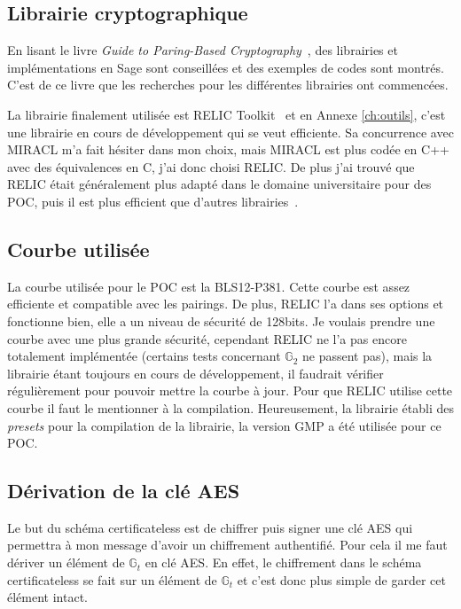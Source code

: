 \subsection{Librairie cryptographique}
En lisant le livre \textit{Guide to Paring-Based Cryptography}~\cite{bookPairing}, des librairies et implémentations en Sage sont conseillées et des exemples de codes sont montrés. C'est de ce livre que les recherches pour les différentes librairies ont commencées.

La librairie finalement utilisée est RELIC Toolkit~\cite{relic-toolkit} et en Annexe \ref{ch:outils}, c'est une librairie en cours de développement qui se veut efficiente. Sa concurrence avec MIRACL m'a fait hésiter dans mon choix, mais MIRACL est plus codée en C++ avec des équivalences en C, j'ai donc choisi RELIC. De plus j'ai trouvé que RELIC était généralement plus adapté dans le domaine universitaire pour des POC, puis il est plus efficient que d'autres librairies~\cite{performanceRELIC}.

\subsection{Courbe utilisée}
La courbe utilisée pour le POC est la BLS12-P381. Cette courbe est assez efficiente et compatible avec les pairings. De plus, RELIC l'a dans ses options et fonctionne bien, elle a un niveau de sécurité de 128bits. Je voulais prendre une courbe avec une plus grande sécurité, cependant RELIC ne l'a pas encore totalement implémentée (certains tests concernant $\mathbb{G}_2$ ne passent pas), mais la librairie étant toujours en cours de développement, il faudrait vérifier régulièrement pour pouvoir mettre la courbe à jour. Pour que RELIC utilise cette courbe il faut le mentionner à la compilation. Heureusement, la librairie établi des \textit{presets} pour la compilation de la librairie, la version GMP a été utilisée pour ce POC.

\subsection{Dérivation de la clé AES}
Le but du schéma certificateless est de chiffrer puis signer une clé AES qui permettra à mon message d'avoir un chiffrement authentifié. Pour cela il me faut dériver un élément de $\mathbb{G}_t$ en clé AES. En effet, le chiffrement dans le schéma certificateless se fait sur un élément de $\mathbb{G}_t$ et c'est donc plus simple de garder cet élément intact.


